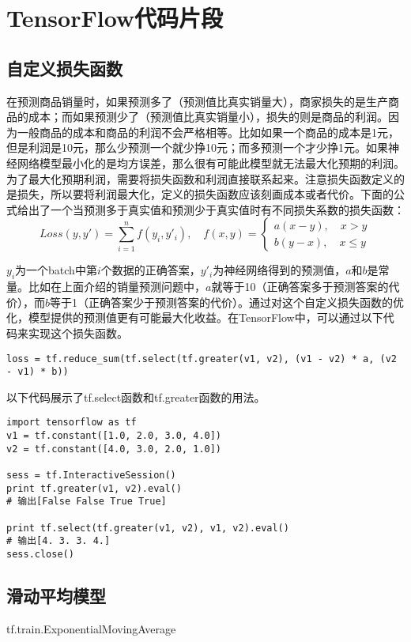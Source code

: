 \documentclass[10pt,a4paper]{ctexbook}
\begin{document}
\section{TensorFlow代码片段}
\subsection{自定义损失函数}
在预测商品销量时，如果预测多了（预测值比真实销量大），商家损失的是生产商品的成本；而如果预测少了（预测值比真实销量小），损失的则是商品的利润。因为一般商品的成本和商品的利润不会严格相等。比如如果一个商品的成本是1元，但是利润是10元，那么少预测一个就少挣10元；而多预测一个才少挣1元。如果神经网络模型最小化的是均方误差，那么很有可能此模型就无法最大化预期的利润。为了最大化预期利润，需要将损失函数和利润直接联系起来。注意损失函数定义的是损失，所以要将利润最大化，定义的损失函数应该刻画成本或者代价。下面的公式给出了一个当预测多于真实值和预测少于真实值时有不同损失系数的损失函数：
\[
Loss(y,y')=\sum\limits_{i=1}^{n}{f(y_{i},y'_{i})}, \quad f(x,y)=\left\{
\begin{aligned}
    a(x-y), \quad x > y \\
    b(y-x), \quad x \leq y
\end{aligned}
\right.
\]

$y_{i}$为一个batch中第$i$个数据的正确答案，$y'_{i}$为神经网络得到的预测值，$a$和$b$是常量。比如在上面介绍的销量预测问题中，$a$就等于10（正确答案多于预测答案的代价），而$b$等于1（正确答案少于预测答案的代价）。通过对这个自定义损失函数的优化，模型提供的预测值更有可能最大化收益。在TensorFlow中，可以通过以下代码来实现这个损失函数。
\begin{verbatim}
loss = tf.reduce_sum(tf.select(tf.greater(v1, v2), (v1 - v2) * a, (v2 - v1) * b))
\end{verbatim}

以下代码展示了tf.select函数和tf.greater函数的用法。
\begin{verbatim}
import tensorflow as tf
v1 = tf.constant([1.0, 2.0, 3.0, 4.0])
v2 = tf.constant([4.0, 3.0, 2.0, 1.0])

sess = tf.InteractiveSession()
print tf.greater(v1, v2).eval()
# 输出[False False True True]

print tf.select(tf.greater(v1, v2), v1, v2).eval()
# 输出[4. 3. 3. 4.]
sess.close()
\end{verbatim}


\subsection{滑动平均模型}
tf.train.ExponentialMovingAverage
\end{document}
